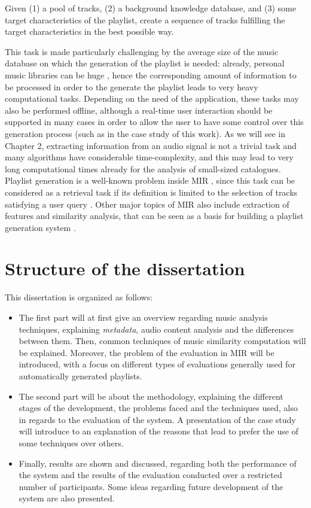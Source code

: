 \begin{displayquote}
Given (1) a pool of tracks, (2) a background knowledge database, and (3) some target characteristics of the playlist, create a sequence of tracks fulfilling the target characteristics in the best possible way.
\end{displayquote}

This task is made particularly challenging by the average size of the music database on which the generation of the playlist is needed: already, personal music libraries can be huge \cite{dias10}, hence the corresponding amount of information to be processed in order to the generate the playlist leads to very heavy computational tasks. Depending on the need of the application, these tasks may also be performed offline, although a real-time user interaction should be supported in many cases in order to allow the user to have some control over this generation process (such as in the case study of this work). As we will see in Chapter 2, extracting information from an audio signal is not a trivial task and many algorithms have considerable time-complexity, and this may lead to very long computational times already for the analysis of small-sized catalogues. Playlist generation is a well-known problem inside MIR \cite{downey03} \cite{grachten09}, since this task can be considered as a retrieval task if its definition is limited to the selection of tracks satisfying a user query \cite{bonnin14}. Other major topics of MIR also include extraction of features and similarity analysis, that can be seen as a basis for building a playlist generation system \cite{dopler08}. 

\section{Structure of the dissertation}
This dissertation is organized as follows:
\begin{itemize}
\item The first part will at first give an overview regarding music analysis techniques, explaining \textit{metadata}, audio content analysis and the differences between them. Then, common techniques of music similarity computation will be explained. Moreover, the problem of the evaluation in MIR will be introduced, with a focus on different types of evaluations generally used for automatically generated playlists. 
\item The second part will be about the methodology, explaining the different stages of the development, the problems faced and the techniques used, also in regards to the evaluation of the system. A presentation of the case study will introduce to an explanation of the reasons that lead to prefer the use of some techniques over others. 
\item Finally, results are shown and discussed, regarding both the performance of the system and the results of the evaluation conducted over a restricted number of participants. Some ideas regarding future development of the system are also presented.
\end{itemize}

